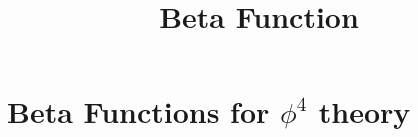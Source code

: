 \documentclass[fleqn]{article}
\title{Beta Function} %
\begin{document}
\maketitle %




\section{Beta Functions for $\phi ^{4}$ theory} %
\end{document}
